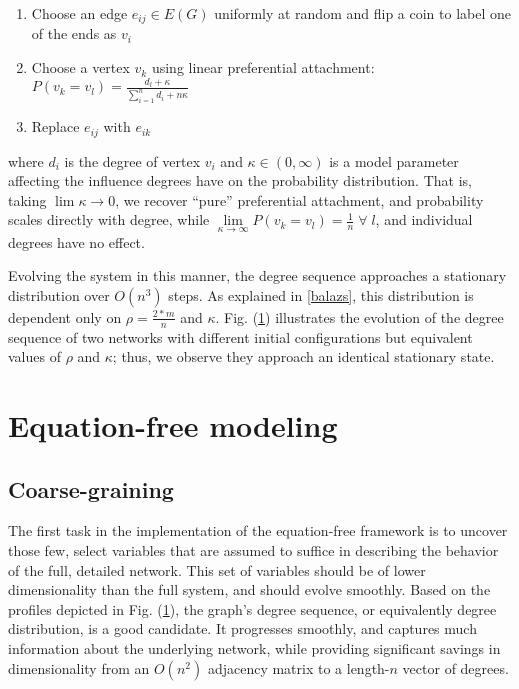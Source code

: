 \documentclass[12pt]{article}
\begin{document}
\begin{onehalfspace}
\begin{enumerate}
\item Choose an edge $e_{ij} \in E(G)$ uniformly at random and flip a coin to label one of the ends as $v_{i}$
\item Choose a vertex $v_{k}$ using linear preferential attachment: $P(v_{k} = v_{l}) = \frac{d_{l} + \kappa}{\sum\limits_{i=1}^{n} d_{i} + n \kappa}$
\item Replace $e_{ij}$ with $e_{ik}$
\end{enumerate}

\noindent where $d_i$ is the degree of vertex $v_i$ and $\kappa \in (0, \infty)$ is a model parameter affecting the influence degrees have on the probability distribution. That is, taking $\lim\limits{\kappa \rightarrow 0}$, we recover ``pure'' preferential attachment, and probability scales directly with degree, while $\lim\limits_{\kappa \rightarrow \infty} P(v_k = v_l) = \frac{1}{n} \; \forall \; l$, and individual degrees have no effect. \par

Evolving the system in this manner, the degree sequence approaches a stationary distribution over $O(n^3)$ steps. As explained in \ref{balazs}, this distribution is dependent only on $\rho = \frac{2*m}{n}$ and $\kappa$. Fig. (\ref{fig:dse}) illustrates the evolution of the degree sequence of two networks with different initial configurations but equivalent values of $\rho$ and $\kappa$; thus, we observe they approach an identical stationary state.

\begin{figure}[h!]
  \label{fig:dse}
\end{figure}

\section{Equation-free modeling}
\label{sec:ef}

\subsection{Coarse-graining}

The first task in the implementation of the equation-free framework is to uncover those few, select variables that are assumed to suffice in describing the behavior of the full, detailed network. This set of variables should be of lower dimensionality than the full system, and should evolve smoothly. Based on the profiles depicted in Fig. (\ref{fig:dse}), the graph's degree sequence, or equivalently degree distribution, is a good candidate. It progresses smoothly, and captures much information about the underlying network, while providing significant savings in dimensionality from an $O(n^2)$ adjacency matrix to a length-$n$ vector of degrees. \par


\end{onehalfspace}
\end{document}
